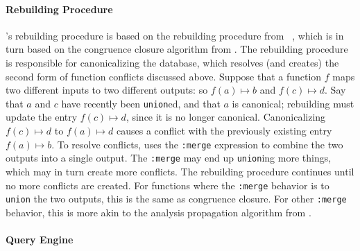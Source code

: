 \paragraph{Rebuilding Procedure}

\Egglog's rebuilding procedure is based on 
 the rebuilding procedure from \egg~\cite{egg},
 which is in turn based on the congruence closure algorithm from \citet{tarjan-congruence}.
The rebuilding procedure is responsible for
 canonicalizing the database,
 which resolves (and creates)
 the second form of function conflicts discussed above.
Suppose that a function 
 $f$ maps two different inputs to two different outputs:
 so $f(a) \mapsto b$ and $f(c) \mapsto d$.
Say that $a$ and $c$ have recently been \lstinline{union}ed,
 and that $a$ is canonical;
 rebuilding must update the entry $f(c) \mapsto d$,
 since it is no longer canonical.
Canonicalizing $f(c) \mapsto d$
 to $f(a) \mapsto d$
 causes a conflict with the previously existing entry $f(a) \mapsto b$.
To resolve conflicts,
 \egglog uses the \lstinline{:merge} expression
 to combine the two outputs into a single output.
The \lstinline{:merge} may end up \lstinline{union}ing more things,
 which may in turn create more conflicts.
The rebuilding procedure continues until
 no more conflicts are created.
For functions where the \lstinline{:merge} 
 behavior is to \lstinline{union} the two outputs,
 this is the same as congruence closure.
For other \lstinline{:merge} behavior,
 this is more akin to the \eclass analysis propagation algorithm
 from \citet{egg}.

\paragraph{Query Engine}

